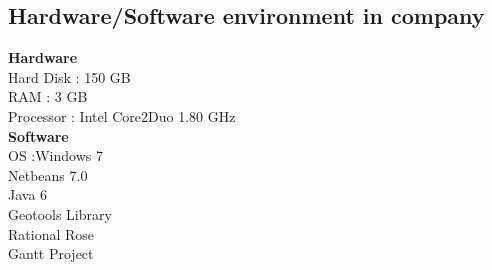 \subsection{Hardware/Software environment in company}
\textbf{Hardware}\\
Hard Disk : 150 GB\\
RAM : 3 GB\\
Processor : Intel Core2Duo 1.80 GHz\\
\textbf{Software}\\
OS        :Windows 7\\
Netbeans 7.0\\
Java 6\\
Geotools Library\\
Rational Rose\\
Gantt Project\\

